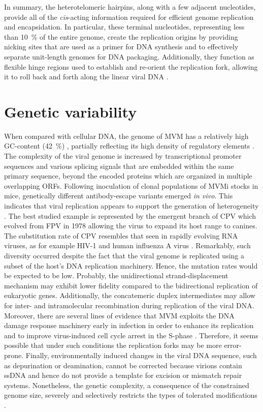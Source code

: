 In summary, the heterotelomeric hairpins, along with a few adjacent nucleotides, provide all of the \textit{cis}-acting information required for efficient genome replication and encapsidation. In particular, these terminal nucleotides, representing less than 10~\% of the entire genome, create the replication origins by providing nicking sites that are used as a primer for DNA synthesis and to effectively separate unit-length genomes for DNA packaging. Additionally, they function as flexible hinge regions used to establish and re-orient the replication fork, allowing it to roll back and forth along the linear viral DNA \cite{telomere2, telomere3, handbook, RHR}.        

\section{Genetic variability}

When compared with cellular DNA, the genome of MVM has a relatively high GC-content (42~\%) \cite{pmid6298737}, partially reflecting its high density of regulatory elements \cite{telomere}. The complexity of the viral genome is increased by transcriptional promoter sequences and various splicing signals that are embedded within the same primary sequence, beyond the encoded proteins which are organized in multiple overlapping ORFs. Following inoculation of clonal populations of MVMi stocks in mice, genetically different antibody-escape variants emerged \textit{in vivo}. This indicates that viral replication appears to support the generation of heterogeneity \cite{pmid12552010}. The best studied example is represented by the emergent branch of CPV which evolved from FPV in 1978 allowing the virus to expand its host range to canines. The substitution rate of CPV resembles that seen in rapidly evolving RNA viruses, as for example HIV-1 and human influenza A virus \cite{pmid15626758}. Remarkably, such diversity occurred despite the fact that the viral genome is replicated using a subset of the host's DNA replication machinery. Hence, the mutation rates would be expected to be low. Probably, the unidirectional strand-displacement mechanism may exhibit lower fidelity compared to the bidirectional replication of eukaryotic genes. Additionally, the concatemeric duplex intermediates may allow for inter- and intramolecular recombination during replication of the viral DNA. Moreover, there are several lines of evidence that MVM exploits the DNA damage response machinery early in infection in order to enhance its replication and to improve virus-induced cell cycle arrest in the S-phase \cite{pmid20949077}. Therefore, it seems possible that under such conditions the replication forks may be more error-prone. Finally, environmentally induced changes in the viral DNA sequence, such as depurination or deamination, cannot be corrected because virions contain ssDNA and hence do not provide a template for excision or mismatch repair systems. Nonetheless, the genetic complexity, a consequence of the constrained genome size, severely and selectively restricts the types of tolerated modifications \cite{telomere}.   

